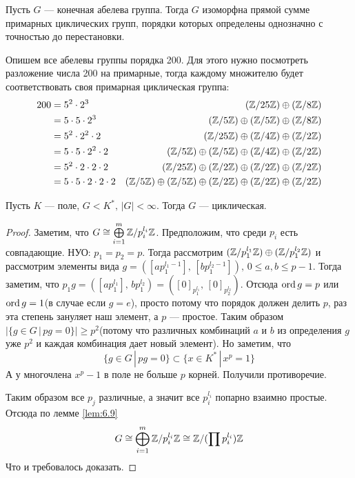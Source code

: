 \documentclass[../main.tex]{subfiles}
\begin{document}
\begin{theorem}
  Пусть $G$ --- конечная абелева группа. Тогда $G$ изоморфна прямой сумме примарных циклических групп, порядки которых определены однозначно с точностью до перестановки.
\end{theorem}
\begin{example}
  Опишем все абелевы группы порядка 200. Для этого нужно посмотреть разложение числа 200 на примарные, тогда каждому множителю будет соответствовать своя примарная циклическая группа:
  \begin{align*}
    200 &= 5^2 \cdot 2^3
        &(\mathbb{Z}/25\mathbb{Z}) \oplus (\mathbb{Z}/8\mathbb{Z})
        \\
        &= 5 \cdot 5 \cdot 2^3
        &(\mathbb{Z}/5\mathbb{Z}) \oplus (\mathbb{Z}/5\mathbb{Z}) \oplus (\mathbb{Z}/8\mathbb{Z})
        \\
        &= 5^2 \cdot 2^2 \cdot 2
        &(\mathbb{Z}/25\mathbb{Z}) \oplus (\mathbb{Z}/4\mathbb{Z}) \oplus (\mathbb{Z}/2\mathbb{Z})
        \\
        &= 5 \cdot 5 \cdot 2^2 \cdot 2
        &(\mathbb{Z}/5\mathbb{Z}) \oplus (\mathbb{Z}/5\mathbb{Z}) \oplus (\mathbb{Z}/4\mathbb{Z}) \oplus (\mathbb{Z}/2\mathbb{Z})
        \\
        &= 5^2 \cdot 2 \cdot 2 \cdot 2
        &(\mathbb{Z}/25\mathbb{Z}) \oplus (\mathbb{Z}/2\mathbb{Z}) \oplus (\mathbb{Z}/2\mathbb{Z}) \oplus (\mathbb{Z}/2\mathbb{Z})
        \\
        &= 5 \cdot 5 \cdot 2 \cdot 2 \cdot 2
        &(\mathbb{Z}/5\mathbb{Z}) \oplus (\mathbb{Z}/5\mathbb{Z}) \oplus (\mathbb{Z}/2\mathbb{Z}) \oplus (\mathbb{Z}/2\mathbb{Z}) \oplus (\mathbb{Z}/2\mathbb{Z})
  \end{align*}
\end{example}

\begin{corollary*}
  Пусть $K$ --- поле, $G < K^{*}, \, |G| < \infty$. Тогда $G$ --- циклическая.
\end{corollary*}
\begin{proof}
  Заметим, что $G \cong \bigoplus\limits_{i = 1}^{m} \mathbb{Z}/p_i^{l_i}\mathbb{Z}$. Предположим, что среди $p_i$ есть совпадающие. НУО: $p_1 = p_2 = p$. Тогда рассмотрим $(\mathbb{Z}/p_1^{l_1}\mathbb{Z}) \oplus (\mathbb{Z}/p_1^{l_2}\mathbb{Z})$ и рассмотрим элементы вида $g = ([ap_1^{l_1 - 1}], \, [bp_1^{l_2 - 1}]), \, 0 \leq a, b \leq p - 1$. Тогда заметим, что $p_1 g = ([ap_1^{l_1}], \, bp_1^{l_2}) = ([0]_{p_1^{l_1}},\, [0]_{p_2^{l_2}})$. Отсюда $\operatorname{ord} g = p$ или $\operatorname{ord} g = 1$(в случае если $g = e$), просто потому что порядок должен делить $p$, раз эта степень зануляет наш элемент, а $p$ --- простое.
  Таким образом $ |\{g \in G \, | \, pg = 0\}| \geq p^2$(потому что различных комбинаций $a$ и $b$ из определения $g$ уже $p^2$ и каждая комбинация дает новый элемент). Но заметим, что
  \begin{equation*}
    \{g \in G \, | \, pg = 0\} \subset \{x \in K^{*} \, | \, x^p = 1\}
  \end{equation*}
  А у многочлена $x^p - 1$ в поле не больше $p$ корней. Получили противоречие.

  Таким образом все $p_j$ различные, а значит все $p_i^{l_i}$ попарно взаимно простые. Отсюда по лемме \ref{lem:6.9}
  \begin{equation*}
    G \cong \bigoplus\limits_{i = 1}^{m} \mathbb{Z}/p_{i}^{l_i}\mathbb{Z} \cong \mathbb{Z}/(\prod p_i^{l_i})\mathbb{Z}
  \end{equation*}
  Что и требовалось доказать.
\end{proof}
\end{document}

